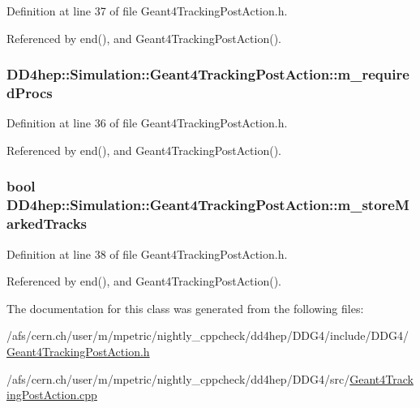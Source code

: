 Definition at line 37 of file Geant4TrackingPostAction.h.

Referenced by end(), and Geant4TrackingPostAction().\hypertarget{class_d_d4hep_1_1_simulation_1_1_geant4_tracking_post_action_a1194a1813aee919384ae90d6672d98c5}{
\subsubsection[{m\_\-requiredProcs}]{ {\bf DD4hep::Simulation::Geant4TrackingPostAction::m\_\-requiredProcs}}}
\label{class_d_d4hep_1_1_simulation_1_1_geant4_tracking_post_action_a1194a1813aee919384ae90d6672d98c5}


Definition at line 36 of file Geant4TrackingPostAction.h.

Referenced by end(), and Geant4TrackingPostAction().\hypertarget{class_d_d4hep_1_1_simulation_1_1_geant4_tracking_post_action_a917619b10aa1e34636fb7fe49ad5575e}{
\subsubsection[{m\_\-storeMarkedTracks}]{\setlength{\rightskip}{0pt plus 5cm}bool {\bf DD4hep::Simulation::Geant4TrackingPostAction::m\_\-storeMarkedTracks}}}
\label{class_d_d4hep_1_1_simulation_1_1_geant4_tracking_post_action_a917619b10aa1e34636fb7fe49ad5575e}


Definition at line 38 of file Geant4TrackingPostAction.h.

Referenced by end(), and Geant4TrackingPostAction().

The documentation for this class was generated from the following files:\begin{DoxyCompactItemize}
\item 
/afs/cern.ch/user/m/mpetric/nightly\_\-cppcheck/dd4hep/DDG4/include/DDG4/\hyperlink{_geant4_tracking_post_action_8h}{Geant4TrackingPostAction.h}\item 
/afs/cern.ch/user/m/mpetric/nightly\_\-cppcheck/dd4hep/DDG4/src/\hyperlink{_geant4_tracking_post_action_8cpp}{Geant4TrackingPostAction.cpp}\end{DoxyCompactItemize}
